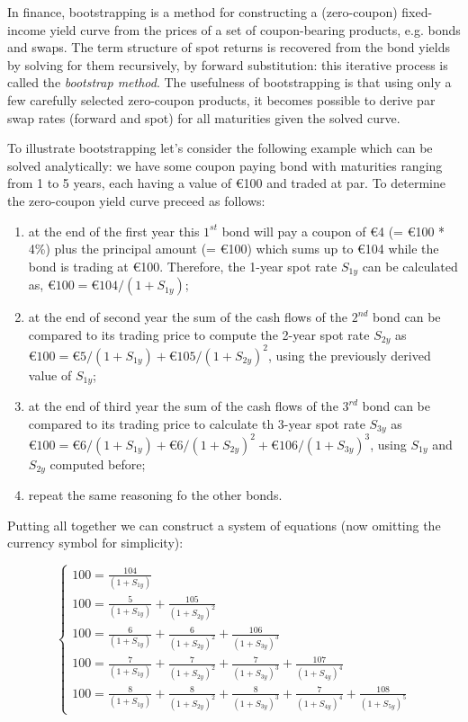 In finance, bootstrapping is a method for constructing a (zero-coupon) fixed-income yield curve from the prices of a set of coupon-bearing products, e.g. bonds and swaps.
The term structure of spot returns is recovered from the bond yields by solving for them recursively, by forward substitution: this iterative process is called the \emph{bootstrap method}.
The usefulness of bootstrapping is that using only a few carefully selected zero-coupon products, it becomes possible to derive par swap rates (forward and spot) for all maturities given the solved curve.

To illustrate bootstrapping let's consider the following example which can be solved analytically: we have some coupon paying bond with maturities ranging from 1 to 5 years, each having a value of \euro{100} and traded at par. To determine the zero-coupon yield curve preceed as follows:

\begin{enumerate}
\item at the end of the first year this $1^{st}$ bond will pay a coupon of \euro{4} (= \euro{100} * 4\%) plus the principal amount (= \euro{100}) which sums up to \euro{104} while the bond is trading at \euro{100}. Therefore, the 1-year spot rate $S_{1y}$ can be calculated as, $\euro{100} = \euro{104} / (1 + S_{1y})$;

\item at the end of second year the sum of the cash flows of the $2^{nd}$ bond can be compared to its trading price to compute the 2-year spot rate $S_{2y}$ as $\euro{100} = \euro{5} / (1 + S_{1y}) + \euro{105} / (1 + S_{2y})^{2}$, using the previously derived value of $S_{1y}$;

\item at the end of third year the sum of the cash flows of the $3^{rd}$ bond can be compared to its trading price to calculate th 3-year spot rate $S_{3y}$ as $\euro{100} = \euro{6} / (1 + S_{1y}) + \euro{6} / (1 + S_{2y})^{2} + \euro{106} / (1 + S_{3y})^{3}$, using $S_{1y}$ and $S_{2y}$ computed before;

\item repeat the same reasoning fo the other bonds.
\end{enumerate}

Putting all together we can construct a system of equations (now omitting the currency symbol for simplicity):

\begin{equation*}
\begin{cases}
100 = \frac{104}{(1 + S_{1y})} \\
100 = \frac{5}{(1 + S_{1y})} + \frac{105}{(1 + S_{2y})^{2}} \\
100 = \frac{6} {(1 + S_{1y})} + \frac{6}{(1 + S_{2y})^{2}} + \frac{106} {(1 + S_{3y})^{3}} \\
100 = \frac{7} {(1 + S_{1y})} + \frac{7} {(1 + S_{2y})^{2}} + \frac{7} {(1 + S_{3y})^{3}} + \frac{107} {(1 + S_{4y})^{4}} \\
100 = \frac{8} {(1 + S_{1y})} + \frac{8} {(1 + S_{2y})^{2}}+ \frac{8} {(1 + S_{3y})^{3}} + \frac{7} {(1 + S_{4y})^{4}} + \frac{108} {(1 + S_{5y})^{5}}
\end{cases}
\end{equation*}

